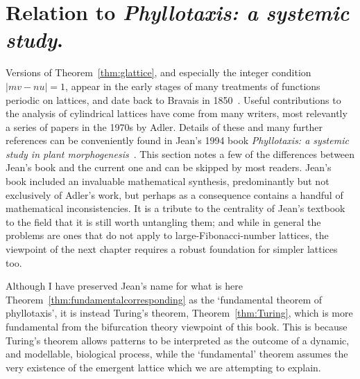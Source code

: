 \section{Relation to \textit{Phyllotaxis: a systemic study}.}
Versions of Theorem~\ref{thm:glattice}, and especially the integer condition $| m v - n u|=1$, appear in the early stages of many treatments of functions periodic on lattices, and date back to Bravais in 1850~\cite{bravaisSystemsFormedPoints1949}. 
Useful contributions to the analysis of cylindrical lattices have come from many writers, most relevantly a series of papers in the 1970s by Adler. Details of these and many further references can be conveniently found in Jean's 1994 book \textit{Phyllotaxis: a systemic study in plant morphogenesis}~\cite{jeanPhyllotaxisSystemicStudy1994}.
This section notes a few of the differences between Jean's book and the current one and can be skipped by most readers.
Jean's book included an invaluable mathematical synthesis, predominantly but not exclusively of Adler's work, but perhaps as a consequence contains a handful of mathematical inconsistencies. It is a tribute to the centrality of Jean's textbook to the field that it is still worth untangling them; and while in general the problems are ones that do not apply to large-Fibonacci-number lattices, the viewpoint of the next chapter requires a robust foundation for simpler lattices too. 

Although I have preserved Jean's name for what is here Theorem~\ref{thm:fundamentalcorresponding} as the `fundamental theorem of phyllotaxis', it is instead Turing's theorem, Theorem~\ref{thm:Turing}, which is more fundamental from the bifurcation theory viewpoint of this book. This is because Turing's theorem allows patterns to be interpreted as the outcome of a dynamic, and modellable, biological process, while the `fundamental' theorem assumes the very existence of the emergent lattice which we are attempting to explain. 

